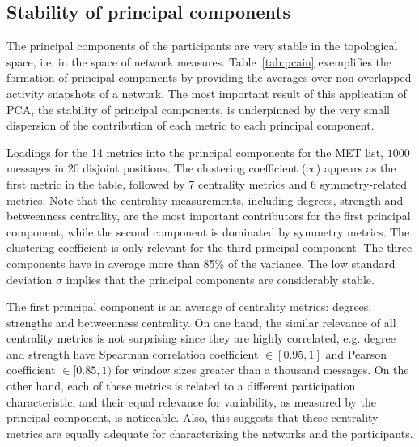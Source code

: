 \subsection{Stability of principal components}\label{prevalence}

The principal components of the participants are very stable in the topological space,
i.e. in the space of network measures.
Table~\ref{tab:pcain} exemplifies the formation of principal components by providing the averages over non-overlapped activity snapshots of a network. The most important result of this application of PCA, the stability of principal components, is underpinned by the very small dispersion of the contribution of each metric to each principal component.

\begin{table}[!h]
\caption{Loadings for the 14 metrics into the principal components for the MET list, $1000$ messages in 20 disjoint positions. The clustering coefficient (cc) appears as the first metric in the table, followed by 7 centrality metrics and 6 symmetry-related metrics. Note that the centrality measurements, including degrees, strength and betweenness centrality, are the most important contributors for the first principal component, while the second component is dominated by symmetry metrics. The clustering coefficient is only relevant for the third principal component. The three components have in average more than 85\% of the variance.
The low standard deviation $\sigma$ implies that the principal components are considerably stable.}
\footnotesize

\label{tab:pcain}
\end{table}

The first principal component is an average of centrality metrics:
degrees, strengths and betweenness centrality.
On one hand, the similar relevance of all centrality metrics is not surprising since they are highly correlated,
e.g. degree and strength have Spearman correlation coefficient $\in [0.95,1]$ 
and Pearson coefficient $\in [0.85,1)$ for window sizes greater than a thousand messages.
On the other hand, each of these metrics is related to a different participation characteristic,
and their equal relevance for variability,
as measured by the principal component, is noticeable.
Also, this suggests that these centrality metrics 
are equally adequate for characterizing the networks
and the participants.

